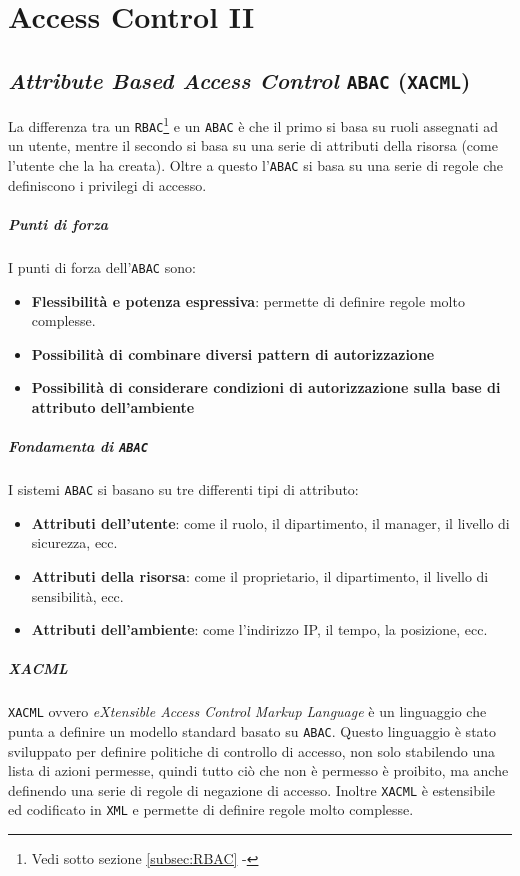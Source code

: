 \chapter{Access Control II}
\label{ch:accessControlII}
\section{\textit{Attribute Based Access Control} \texttt{ABAC} (\texttt{XACML})}    
    La differenza tra un \texttt{RBAC}\footnote{Vedi sotto sezione \ref{subsec:RBAC} - } e un \texttt{ABAC} è che il primo si basa su ruoli assegnati ad un utente, mentre il secondo si basa su una serie di attributi della risorsa (come l'utente che la ha creata). Oltre a questo l'\texttt{ABAC} si basa su una serie di regole che definiscono i privilegi di accesso. 
    \paragraph{Punti di forza} I punti di forza dell'\texttt{ABAC} sono:
        \begin{itemize}
            \item \textbf{Flessibilità e potenza espressiva}: permette di definire regole molto complesse.
            \item \textbf{Possibilità di combinare diversi pattern di autorizzazione} 
            \item \textbf{Possibilità di considerare condizioni di autorizzazione sulla base di attributo dell'ambiente}
        \end{itemize}
    \paragraph{Fondamenta di \texttt{ABAC}} I sistemi \texttt {ABAC} si basano su tre differenti tipi di attributo: 
        \begin{itemize}
            \item \textbf{Attributi dell'utente}: come il ruolo, il dipartimento, il manager, il livello di sicurezza, ecc.
            \item \textbf{Attributi della risorsa}: come il proprietario, il dipartimento, il livello di sensibilità, ecc.
            \item \textbf{Attributi dell'ambiente}: come l'indirizzo IP, il tempo, la posizione, ecc.
        \end{itemize}
    \paragraph{XACML}
    \texttt{XACML} ovvero \textit{eXtensible Access Control Markup Language} è un linguaggio che punta a definire un modello standard basato su \texttt{ABAC}. Questo linguaggio è stato sviluppato per definire politiche di controllo di accesso, non solo stabilendo una lista di azioni permesse, quindi tutto ciò che non è permesso è proibito, ma anche definendo una serie di regole di negazione di accesso.\newline
    Inoltre \texttt{XACML} è estensibile ed codificato in \texttt{XML} e permette di definire regole molto complesse.
